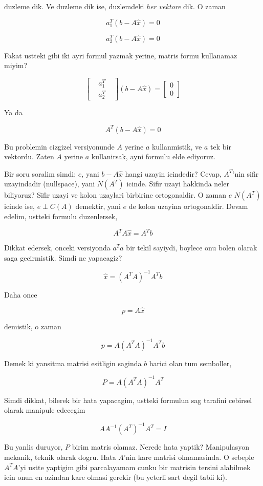 \documentclass[12pt,fleqn]{article}\usepackage{../common}
\begin{document}
duzleme dik. Ve duzleme dik ise, duzlemdeki {\em her vektore} dik. O zaman 

\[ a_1^T( b - A\hat{x}) = 0\]

\[ a_2^T( b - A\hat{x}) = 0\]

Fakat ustteki gibi iki ayri formul yazmak yerine, matris formu kullanamaz
miyim? 

\[ 
\left[\begin{array}{rrr}
 & a_1^T & \\
 & a_2^T & 
\end{array}\right]
(b - A\hat{x}) = 
\left[\begin{array}{rrr}
0 \\
0 
\end{array}\right]
 \]

Ya da

\[ A^T(b - A\hat{x})  = 0 \]

Bu problemin cizgizel versiyonunde $A$ yerine $a$ kullanmistik, ve $a$ tek
bir vektordu. Zaten $A$ yerine $a$ kullanirsak, ayni formulu elde
ediyoruz. 

Bir soru soralim simdi: $e$, yani $b - A\hat{x}$ hangi uzayin icindedir?
Cevap, $A^T$'nin sifir uzayindadir (nullspace), yani $N(A^T)$ icinde. Sifir
uzayi hakkinda neler biliyoruz? Sifir uzayi ve kolon uzaylari birbirine
ortogonaldir. O zaman $e$  $N(A^T)$ icinde ise, $e \perp C(A)$ demektir,
yani $e$ de kolon uzayina ortogonaldir. Devam edelim, ustteki formulu duzenlersek,

\[ A^TA\hat{x} = A^Tb \]

Dikkat edersek, onceki versiyonda $a^Ta$ bir tekil sayiydi, boylece onu
bolen olarak saga gecirmistik. Simdi ne yapacagiz? 

\[ \hat{x} = (A^TA)^{-1}A^Tb \]

Daha once 

\[ p = A\hat{x} \]

demistik, o zaman 

\[ p = A(A^TA)^{-1}A^Tb \]

Demek ki yansitma matrisi esitligin saginda $b$ harici olan tum semboller, 

\[ P = A(A^TA)^{-1}A^T \]

Simdi dikkat, bilerek bir hata yapacagim, ustteki formulun sag tarafini
cebirsel olarak manipule edecegim

\[  AA^{-1}(A^T)^{-1}A^T = I\]

Bu yanlis duruyor, $P$ birim matris olamaz. Nerede hata yaptik?
Manipulasyon mekanik, teknik olarak dogru. Hata $A$'nin kare matrisi
olmamasinda. O sebeple $A^TA$'yi ustte yaptigim gibi parcalayamam cunku
bir matrisin tersini alabilmek icin onun en azindan kare olmasi gerekir (bu
yeterli sart degil tabii ki). 
\end{document}
